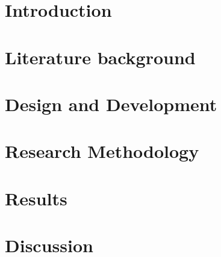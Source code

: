 \documentclass[12pt,a4paper]{book}
\newcommand{\blankpage}[0]{
	\newpage
	\thispagestyle{plain}
	\mbox{}
}
\begin{document}
\hypersetup{pageanchor=false}

\blankpage	
\cleardoublepage
\frontmatter



\tableofcontents
\listoftables
\listoffigures
\hypersetup{pageanchor=true}

\mainmatter
\chapter{Introduction}\label{part:introduction}


%

\chapter{Literature background}\label{part:literature}


\chapter{Design and Development}\label{part:development}


\chapter{Research Methodology}\label{part:method}


\chapter{Results}\label{part:results}


\chapter{Discussion}\label{part:discussion}


\end{document}
